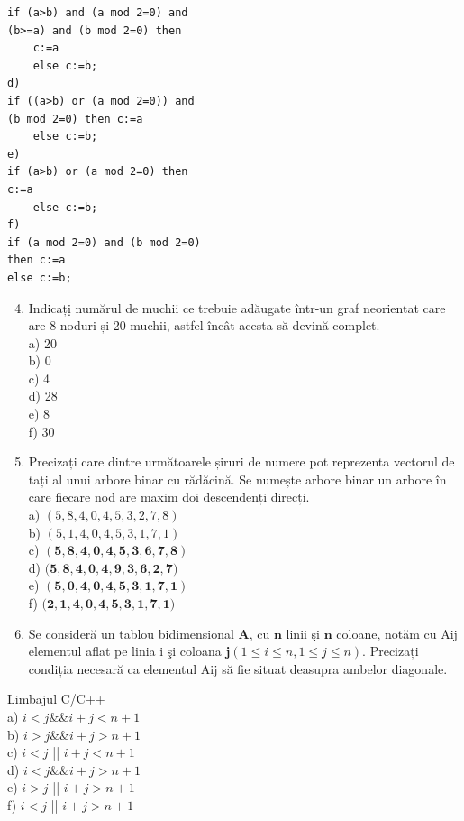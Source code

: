 \documentclass[10pt]{article}
\begin{document}
\begin{verbatim}
if (a>b) and (a mod 2=0) and
(b>=a) and (b mod 2=0) then
    c:=a
    else c:=b;
d)
if ((a>b) or (a mod 2=0)) and
(b mod 2=0) then c:=a
    else c:=b;
e)
if (a>b) or (a mod 2=0) then
c:=a
    else c:=b;
f)
if (a mod 2=0) and (b mod 2=0)
then c:=a
else c:=b;
\end{verbatim}

\begin{enumerate}
  \setcounter{enumi}{3}
  \item Indicațị numărul de muchii ce trebuie adăugate într-un graf neorientat care are 8 noduri și 20 muchii, astfel încât acesta să devină complet.\\
a) 20\\
b) 0\\
c) 4\\
d) 28\\
e) 8\\
f) 30
  \item Precizați care dintre următoarele șiruri de numere pot reprezenta vectorul de tați al unui arbore binar cu rădăcină. Se numește arbore binar un arbore în care fiecare nod are maxim doi descendenți direcți.\\
a) $(5,8,4,0,4,5,3,2,7,8)$\\
b) $(5,1,4,0,4,5,3,1,7,1)$\\
c) $(\mathbf{5 , 8 , 4 , 0 , 4 , 5 , 3 , 6 , 7 , 8})$\\
d) $(\mathbf{5 , 8 , 4 , 0 , 4 , 9 , 3 , 6 , 2 , 7 )}$\\
e) $\mathbf{( 5 , 0 , 4 , 0 , 4 , 5 , 3 , 1 , 7 , 1 )}$\\
f) $(\mathbf{2 , 1 , 4 , 0 , 4 , 5 , 3 , 1 , 7 , 1 )}$
  \item Se consideră un tablou bidimensional $\mathbf{A}$, cu $\mathbf{n}$ linii şi $\mathbf{n}$ coloane, notăm cu Aij elementul aflat pe linia i şi coloana $\mathbf{j}(1 \leq i \leq n, 1 \leq j \leq n)$. Precizați condiția necesară ca elementul Aij să fie situat deasupra ambelor diagonale.
\end{enumerate}

Limbajul C/C++\\
a) $i<j \& \& i+j<n+1$\\
b) $i>j \& \& i+j>n+1$\\
c) $i<j$ || $i+j<n+1$\\
d) $i<j \& \& i+j>n+1$\\
e) $i>j$ || $i+j>n+1$\\
f) $i<j$ || $i+j>n+1$
\end{document}
